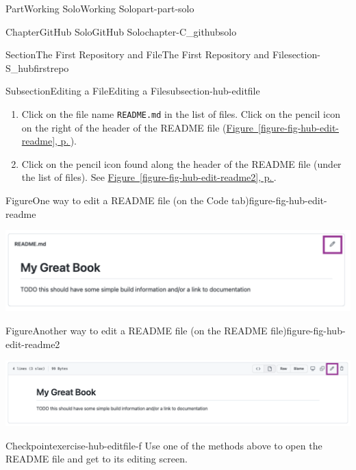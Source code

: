 \documentclass[twoside,10pt,]{book}
\newcommand{\xreffont}{\relax}
\newcommand{\mono}[1]{\texttt{#1}}
\begin{document}
\begin{partptx}{Part}{Working Solo}{}{Working Solo}{}{}{part-part-solo}
\begin{chapterptx}{Chapter}{GitHub Solo}{}{GitHub Solo}{}{}{chapter-C_githubsolo}
\begin{sectionptx}{Section}{The First Repository and File}{}{The First Repository and File}{}{}{section-S_hubfirstrepo}
\begin{subsectionptx}{Subsection}{Editing a File}{}{Editing a File}{}{}{subsection-hub-editfile}
\begin{enumerate}
\item{}Click on the file name \mono{README.md} in the list of files. Click on the pencil icon on the right of the header of the README file (\hyperref[figure-fig-hub-edit-readme]{Figure~{\xreffont\ref{figure-fig-hub-edit-readme}}, p.\,\pageref{figure-fig-hub-edit-readme}}).%
\item{}Click on the pencil icon found along the header of the README file (under the list of files). See \hyperref[figure-fig-hub-edit-readme2]{Figure~{\xreffont\ref{figure-fig-hub-edit-readme2}}, p.\,\pageref{figure-fig-hub-edit-readme2}}.%
\end{enumerate}
%
\begin{figureptx}{Figure}{One way to edit a README file (on the Code tab)}{figure-fig-hub-edit-readme}{}%
\begin{image}{0.05}{0.9}{0.05}{}%
\includegraphics[width=\linewidth]{external/hub_edit_readme_code.pdf}
\end{image}%
\tcblower
\end{figureptx}%
\begin{figureptx}{Figure}{Another way to edit a README file (on the README file)}{figure-fig-hub-edit-readme2}{}%
\begin{image}{0.05}{0.9}{0.05}{}%
\includegraphics[width=\linewidth]{external/hub_edit_readme_file.pdf}
\end{image}%
\tcblower
\end{figureptx}%
\begin{inlineexercise}{Checkpoint}{}{exercise-hub-editfile-f}%
Use one of the methods above to open the README file and get to its editing screen.%
\end{inlineexercise}%

\end{subsectionptx}
\end{sectionptx}
\end{chapterptx}
\end{partptx}
\end{document}
